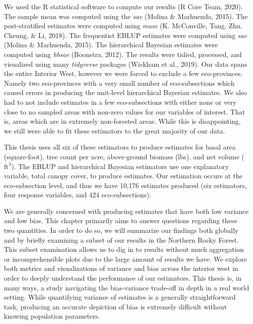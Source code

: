 \documentclass[12pt,twoside]{reedthesis}
\begin{document}
We used the R statistical software to compute our results (R Core Team, 2020). The sample mean was computed using the \emph{sae} (Molina \& Marhuenda, 2015). The post-stratified estimates were computed using \emph{mase} (K. McConville, Tang, Zhu, Cheung, \& Li, 2018). The frequentist EBLUP estimates were computed using \emph{sae} (Molina \& Marhuenda, 2015). The hierarchical Bayesian estimates were computed using \emph{hbsae} (Boonstra, 2012). The results were tidied, processed, and visualized using many \emph{tidyverse} packages (Wickham et al., 2019). Our data spans the entire Interior West, however we were forced to exclude a few eco-provinces. Namely two eco-provinces with a very small number of eco-subsections which caused errors in producing the unit-level hierarchical Bayesian estimates. We also had to not include estimates in a few eco-subsections with either none or very close to no sampled areas with non-zero values for our variables of interest. That is, areas which are in extremely non-forested areas. While this is disappointing, we still were able to fit these estimators to the great majority of our data.

This thesis uses all six of these estimators to produce estimates for basal area (square-foot), tree count per acre, above-ground biomass (lbs), and net volume (\(\text{ft}^3\)). The EBLUP and hierarchical Bayesian estimators use one explanatory variable, total canopy cover, to produce estimates. Our estimation occurs at the eco-subsection level, and thus we have 10,176 estimates produced (six estimators, four response variables, and 424 eco-subsections).

We are generally concerned with producing estimates that have both low variance and low bias. This chapter primarily aims to answer questions regarding these two quantities. In order to do so, we will summarize our findings both globally and by briefly examining a subset of our results in the Northern Rocky Forest. This subset examination allows us to dig in to results without much aggregation or incomprehensible plots due to the large amount of results we have. We explore both metrics and visualizations of variance and bias across the interior west in order to deeply understand the performance of our estimators. This thesis is, in many ways, a study navigating the bias-variance trade-off in depth in a real world setting. While quantifying variance of estimates is a generally straightforward task, producing an accurate depiction of bias is extremely difficult without knowing population parameters.
\end{document}

